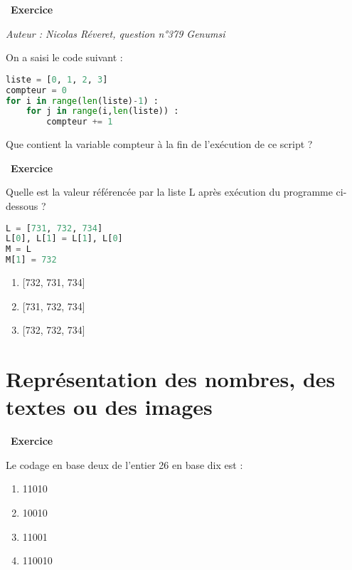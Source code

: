 \documentclass[
  11pt,
]{article}
\providecommand{\tightlist}{%
  \setlength{\itemsep}{0pt}\setlength{\parskip}{0pt}}
\newcounter{exo}
\newenvironment{exercice}[1]
{\par \medskip   \addtocounter{exo}{1} \noindent  
\begin{bclogo}[arrondi =0.1,   noborder = true, logo=\bccrayon, marge=4]{~\textbf{Exercice} \textbf{\theexo} {\itshape #1} }  \par}
{
\end{bclogo}
 \par \bigskip }
\newcounter{def}
\newcounter{prog}
\begin{document}
\begin{exercice}{}

\emph{Auteur : Nicolas Réveret, question n°379 Genumsi}

On a saisi le code suivant :

\begin{lstlisting}[language=Python]
liste = [0, 1, 2, 3]
compteur = 0
for i in range(len(liste)-1) :
    for j in range(i,len(liste)) :
        compteur += 1
\end{lstlisting}

Que contient la variable compteur à la fin de l'exécution de ce script ?

\end{exercice}

\begin{exercice}{}

Quelle est la valeur référencée par la liste L après exécution du
programme ci-dessous ?

\begin{lstlisting}[language=Python]
L = [731, 732, 734]
L[0], L[1] = L[1], L[0]
M = L
M[1] = 732
\end{lstlisting}

\begin{enumerate}
\def\labelenumi{\arabic{enumi}.}
\tightlist
\item
  {[}732, 731, 734{]}
\item
  {[}731, 732, 734{]}
\item
  {[}732, 732, 734{]}
\end{enumerate}

\end{exercice}

\hypertarget{repruxe9sentation-des-nombres-des-textes-ou-des-images}{%
\section{Représentation des nombres, des textes ou des
images}\label{repruxe9sentation-des-nombres-des-textes-ou-des-images}}

\begin{exercice}{}

Le codage en base deux de l'entier 26 en base dix est :

\begin{enumerate}
\def\labelenumi{\arabic{enumi}.}
\tightlist
\item
  11010
\item
  10010
\item
  11001
\item
  110010
\end{enumerate}

\end{exercice}
\end{document}
